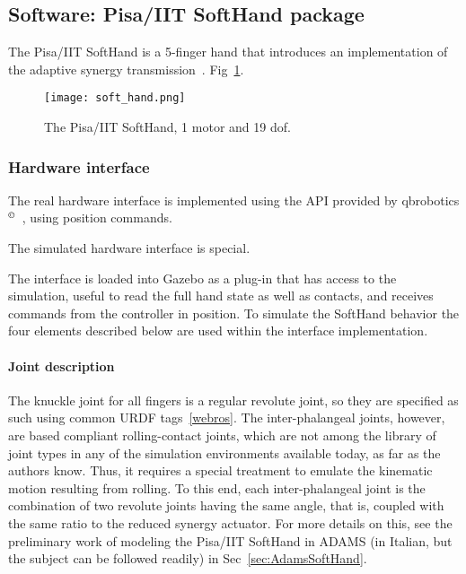 \subsection{Software: Pisa/IIT SoftHand package}
\label{sec:softhand}

The Pisa/IIT SoftHand is a 5-finger hand that introduces an implementation of the adaptive synergy transmission~\cite{Catalano2014Adaptive}. Fig~\ref{fig:soft_hand}.

\begin{figure}[b]
\centering
\texttt{[image: soft\_hand.png]}
\caption{The Pisa/IIT SoftHand, 1 motor and 19 dof.}
\label{fig:soft_hand}
\end{figure}

\subsubsection{Hardware interface}

The real hardware interface is implemented using the API provided by qbrobotics$^{\copyright}$~\cite{qbrobotics_software}, using position commands. 

The simulated hardware interface is special. 

The interface is loaded into Gazebo as a plug-in that has access to the simulation, useful to read the full hand state as well as contacts, and receives commands from the controller in position. To simulate the SoftHand behavior the four elements described below are used within the interface implementation.

\paragraph{Joint description} The knuckle joint for all fingers is a regular revolute joint, so they are specified as such using common URDF tags~\ref{webros}. The inter-phalangeal joints, however, are based compliant rolling-contact joints, which are not among the library of joint types in any of the simulation environments available today, as far as the authors know. Thus, it requires a special treatment to emulate the kinematic motion resulting from rolling. To this end, each inter-phalangeal joint is the combination of two revolute joints having the same angle, that is, coupled with the same ratio to the reduced synergy actuator. For more details on this, see the preliminary work of modeling the Pisa/IIT SoftHand in ADAMS (in Italian, but the subject can be followed readily) in Sec~\ref{sec:AdamsSoftHand}.

